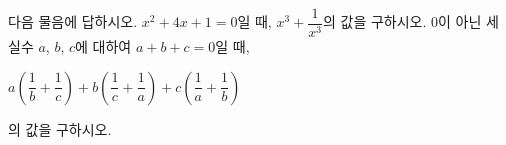 다음 물음에 답하시오.
 $x^2+4x+1=0$일 때, $x^3+\dfrac{1}{x^3}$의 값을 구하시오.
 $0$이 아닌 세 실수 $a$, $b$, $c$에 대하여 $a+b+c=0$일 때,\par\smallskip\centerline{$a\left(\dfrac{1}{b}+\dfrac{1}{c}\right)+b\left(\dfrac{1}{c}+\dfrac{1}{a}\right)+c\left(\dfrac{1}{a}+\dfrac{1}{b}\right)$}\par\smallskip\noindent\hspace*{1.6em}의 값을 구하시오.
